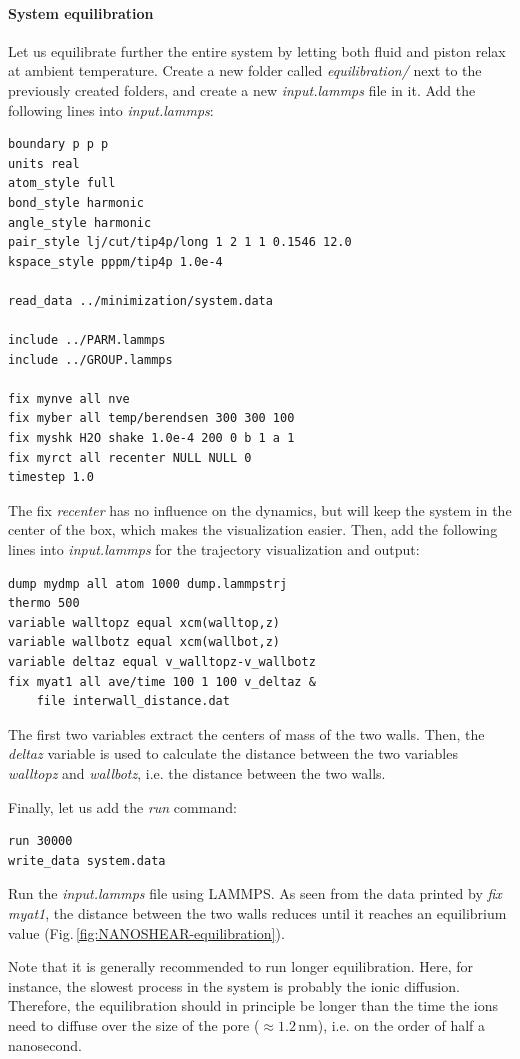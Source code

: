 \documentclass[9pt,tutorial]{livecoms}
\begin{document}
\paragraph{System equilibration}
Let us equilibrate further the entire system by letting both fluid and piston relax at ambient temperature. Create a new folder called \textit{equilibration/} next to the previously created folders, and create a new \textit{input.lammps} file in it. Add the following lines into \textit{input.lammps}:
{\normalsize \begin{verbatim}
boundary p p p
units real
atom_style full
bond_style harmonic
angle_style harmonic
pair_style lj/cut/tip4p/long 1 2 1 1 0.1546 12.0
kspace_style pppm/tip4p 1.0e-4

read_data ../minimization/system.data

include ../PARM.lammps
include ../GROUP.lammps

fix mynve all nve
fix myber all temp/berendsen 300 300 100
fix myshk H2O shake 1.0e-4 200 0 b 1 a 1
fix myrct all recenter NULL NULL 0
timestep 1.0
\end{verbatim}}
The fix \textit{recenter} has no influence on the dynamics, but will keep the system in the center of the box, which makes the
visualization easier. Then, add the following lines into \textit{input.lammps} for the trajectory visualization and output:
{\normalsize \begin{verbatim}
dump mydmp all atom 1000 dump.lammpstrj
thermo 500
variable walltopz equal xcm(walltop,z)
variable wallbotz equal xcm(wallbot,z)
variable deltaz equal v_walltopz-v_wallbotz
fix myat1 all ave/time 100 1 100 v_deltaz &
    file interwall_distance.dat
\end{verbatim}}
The first two variables extract the centers of mass of the two walls. Then, the \textit{deltaz} variable is used to calculate the distance between the two variables \textit{walltopz} and \textit{wallbotz}, i.e. the distance between the two walls.

Finally, let us add the \textit{run} command: 
{\normalsize \begin{verbatim}
run 30000
write_data system.data  
\end{verbatim}}
Run the \textit{input.lammps} file using LAMMPS. As seen from the data printed by \textit{fix myat1}, the distance between the two walls reduces until it reaches an equilibrium value (Fig.\,\ref{fig:NANOSHEAR-equilibration}).

Note that it is generally recommended to run longer equilibration. Here, for instance, the slowest process in the system is probably the ionic diffusion. Therefore, the equilibration should in principle be longer than the time
the ions need to diffuse over the size of the pore ($\approx 1.2\,\text{nm}$), i.e. on the order of half a nanosecond.
\end{document}
